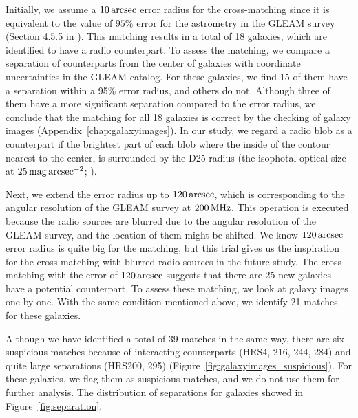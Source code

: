 Initially, we assume a $10\,\mathrm{arcsec}$ error radius for the cross-matching since it is equivalent to the value of $95\%$ error for the astrometry in the GLEAM survey (Section 4.5.5 in \citealt{Hurley-Walker2017a}).
This matching results in a total of 18 galaxies, which are identified to have a radio counterpart.
To assess the matching, we compare a separation of counterparts from the center of galaxies with coordinate uncertainties in the GLEAM catalog.
For these galaxies, we find 15 of them have a separation within a 95\% error radius, and others do not.
Although three of them have a more significant separation compared to the error radius, we conclude that the matching for all 18 galaxies is correct by the checking of galaxy images (Appendix~\ref{chap:galaxyimages}).
In our study, we regard a radio blob as a counterpart if the brightest part of each blob where the inside of the contour nearest to the center, is surrounded by the D25 radius (the isophotal optical size at $25\,\mathrm{mag}\,\mathrm{arcsec}^{-2}$; \citealt{Boselli2010}).

Next, we extend the error radius up to $120\,\mathrm{arcsec}$, which is corresponding to the angular resolution of the GLEAM survey at $200\,\mathrm{MHz}$.
This operation is executed because the radio sources are blurred due to the angular resolution of the GLEAM survey, and the location of them might be shifted.
We know $120\,\mathrm{arcsec}$ error radius is quite big for the matching, but this trial gives us the inspiration for the cross-matching with blurred radio sources in the future study.
The cross-matching with the error of $120\,\mathrm{arcsec}$ suggests that there are 25 new galaxies have a potential counterpart.
To assess these matching, we look at galaxy images one by one.
With the same condition mentioned above, we identify 21 matches for these galaxies.

Although we have identified a total of 39 matches in the same way, there are six suspicious matches because of interacting counterparts (HRS4, 216, 244, 284) and quite large separations (HRS200, 295) (Figure~\ref{fig:galaxyimages_suspicious}).
For these galaxies, we flag them as suspicious matches, and we do not use them for further analysis.
The distribution of separations for galaxies showed in Figure~\ref{fig:separation}.

